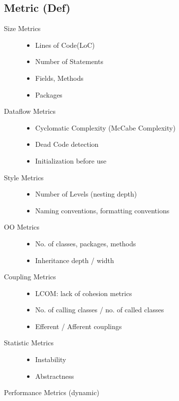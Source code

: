 \documentclass[a4paper,10pt]{article}
\begin{document}
\subsection{Metric (Def)}
\begin{description}
	\item[Size Metrics] \hfill 
		\begin{itemize}
			\item Lines of Code(LoC)
			\item Number of Statements
			\item Fields, Methods
			\item Packages
		\end{itemize}
	\item[Dataflow Metrics] \hfill
		\begin{itemize}
			\item Cyclomatic Complexity (McCabe Complexity)
			\item Dead Code detection
			\item Initialization before use
		\end{itemize}
	\item[Style Metrics] \hfill 
		\begin{itemize}
			\item Number of Levels (nesting depth)
			\item Naming conventions, formatting conventions
		\end{itemize}
	\item[OO Metrics] \hfill
		\begin{itemize}
			\item No. of classes, packages, methods
			\item Inheritance depth / width
		\end{itemize}
	\item[Coupling Metrics] \hfill
		\begin{itemize}
			\item LCOM: lack of cohesion metrics
			\item No. of calling classes / no. of called classes
			\item Efferent / Afferent couplings
		\end{itemize}
	\item[Statistic Metrics] \hfill
		\begin{itemize}
			\item Instability
			\item Abstractness
		\end{itemize}
	\item[Performance Metrics (dynamic)] \hfill 

\end{description}
\end{document}
